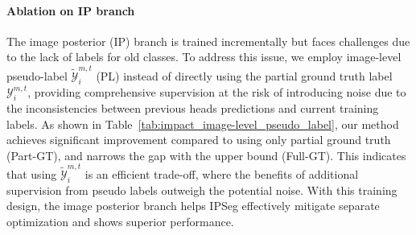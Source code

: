 
\paragraph{Ablation on IP branch} The image posterior (IP) branch is trained incrementally but faces challenges due to the lack of labels for old classes. To address this issue, we employ image-level pseudo-label \(\tilde{\mathcal{Y}}^{m,t}_i\) (PL) instead of directly using the partial ground truth label \(\mathcal{Y}^{m,t}_i\), providing comprehensive supervision at the risk of introducing noise due to the inconsistencies between previous heads predictions and current training labels. As shown in Table~\ref{tab:impact_image-level_pseudo_label}, our method achieves significant improvement compared to using only partial ground truth (Part-GT),
and narrows the gap with the upper bound (Full-GT).
This indicates that using \(\tilde{\mathcal{Y}}^{m,t}_i\) is an efficient trade-off, where the benefits of additional supervision from pseudo labels outweigh the potential noise. With this training design, the image posterior branch helps IPSeg effectively mitigate separate optimization and shows superior performance.

\vspace{-8pt}
